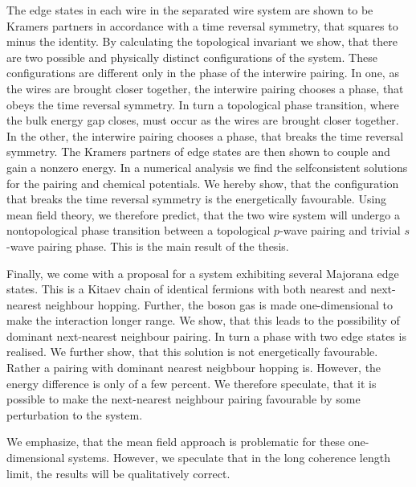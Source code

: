 \documentclass[11pt, twoside]{Thesis}
\begin{document}
The edge states in each wire in the separated wire system are shown to be Kramers partners in accordance with a time reversal symmetry, that squares to minus the identity. By calculating the topological invariant we show, that there are two possible and physically distinct configurations of the system. These configurations are different only in the phase of the interwire pairing. In one, as the wires are brought closer together, the interwire pairing chooses a phase, that obeys the time reversal symmetry. In turn a topological phase transition, where the bulk energy gap closes, must occur as the wires are brought closer together. In the other, the interwire pairing chooses a phase, that breaks the time reversal symmetry. The Kramers partners of edge states are then shown to couple and gain a nonzero energy. In a numerical analysis we find the selfconsistent solutions for the pairing and chemical potentials. We hereby show, that the configuration that breaks the time reversal symmetry is the energetically favourable. Using mean field theory, we therefore predict, that the two wire system will undergo a nontopological phase transition between a topological $p$-wave pairing and trivial $s$-wave pairing phase. This is the main result of the thesis. 

Finally, we come with a proposal for a system exhibiting several Majorana edge states. This is a Kitaev chain of identical fermions with both nearest and next-nearest neighbour hopping. Further, the boson gas is made one-dimensional to make the interaction longer range. We show, that this leads to the possibility of dominant next-nearest neighbour pairing. In turn a phase with two edge states is realised. We further show, that this solution is not energetically favourable. Rather a pairing with dominant nearest neigbbour hopping is. However, the energy difference is only of a few percent. We therefore speculate, that it is possible to make the next-nearest neighbour pairing favourable by some perturbation to the system. 

We emphasize, that the mean field approach is problematic for these one-dimensional systems. However, we speculate that in the long coherence length limit, the results will be qualitatively correct. 
\newpage 

\end{document}
